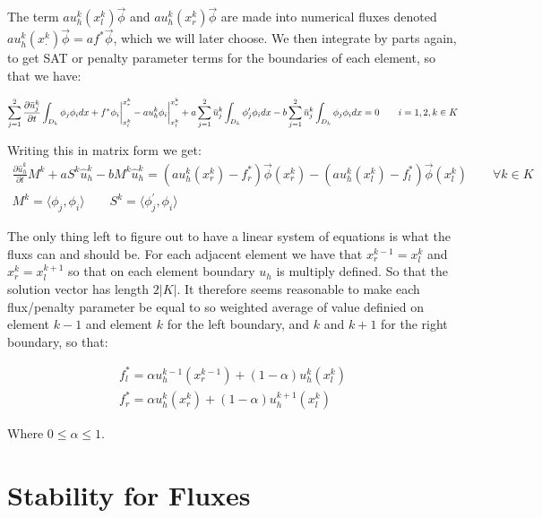 \documentclass{article}
\newcommand{\overbar}[1]{\mkern 1.5mu\overline{\mkern-1.5mu#1\mkern-1.5mu}\mkern 1.5mu}
\begin{document}
\noindent The term $au^k_h(x_l^k)\vec{\phi}$ and $au^k_h(x_r^k)\vec{\phi}$ are made into numerical fluxes denoted $au_h^k(x^k_{\cdot})\vec{\phi} = af^*\vec{\phi}$, which we will later choose. We then integrate by parts again, to get SAT or penalty parameter terms for the boundaries of each element, so that we have:

\begin{gather*}
  \sum_{j=1}^2 \frac{\partial\overbar{u}^k_j}{\partial t}\int_{D_k}\phi_j\phi_i dx
  + f^*\phi_i\biggr\rvert_{x_l^k}^{x_r^k} -  au_h^k\phi_i\biggr\rvert_{x_l^k}^{x_r^k} + a\sum_{j=1}^2 \overbar{u}^k_j\int_{D_k} \phi_j^{\prime} \phi_i dx - b  \sum_{j=1}^2 \overbar{u}^k_j\int_{D_k}\phi_j \phi_i dx = 0 \qquad i = 1,2,  k \in K\\
\end{gather*}

\newpage  

\noindent Writing this in matrix form we get:
\begin{gather}
  \frac{\partial\hat{u}_h^k}{\partial t} M^k + a S^k \hat{u}_h^k - bM^k\hat{u}_h^k = (au_h^k(x_r^k) - f^*_r)\vec{\phi}(x_r^k) - (au_h^k(x_l^k) - f^*_l)\vec{\phi}(x_l^k)\qquad \forall k \in K\\
  M^k = \langle \phi_j, \phi_i \rangle \qquad S^k = \langle \phi_j^{\prime}, \phi_i\rangle
\end{gather}

\noindent The only thing left to figure out to have a linear system of equations is what the fluxs can and should be. For each adjacent element we have that $x^{k-1}_r = x^k_l$ and $x^k_r = x^{k+1}_l$ so that on each element boundary $u_h$ is multiply defined. So that the solution vector has length $2|K|$. It therefore seems reasonable to make each flux/penalty parameter be equal to so weighted average of value definied on element $k-1$ and element $k$ for the left boundary, and $k$ and $k+1$ for the right boundary, so that:

\begin{gather*}
  f^*_l = \alpha u_h^{k-1}(x^{k-1}_r) + (1-\alpha)u_h^k(x^k_l)\\
  f^*_r = \alpha u_h^{k}(x^{k}_r) + (1-\alpha)u_h^{k+1}(x^k_l)
\end{gather*}

Where $0 \leq\alpha \leq 1$.

\section{Stability for Fluxes}
\end{document}
